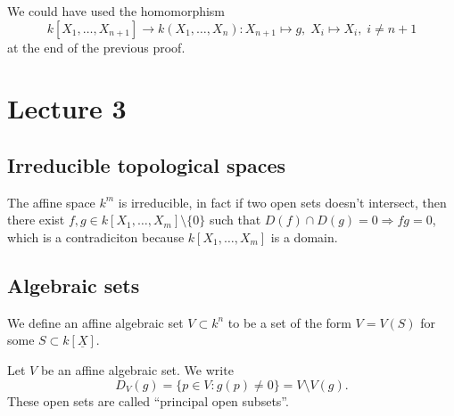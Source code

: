 \begin{remark}
    We could have used the homomorphism 
    \begin{equation}
        k[X_1,\dots,X_{n+1}]\rightarrow k(X_1,\dots,X_n):X_{n+1}\mapsto g,\;X_i\mapsto X_i,\;i\neq n+1
    \end{equation}
    at the end of the previous proof.
\end{remark}

\section{Lecture 3}
\subsection{Irreducible topological spaces}
\begin{example}
    The affine space $k^m$ is irreducible, in fact if two open sets doesn't intersect, then there exist
    $f,g\in k[X_1,\dots,X_m]\setminus\{0\}$ such that $D(f)\cap D(g)=0\Rightarrow fg = 0$, which is a contradiciton 
    because $k[X_1,\dots,X_m]$ is a domain.
\end{example}

\subsection{Algebraic sets}
\begin{dang}
    \begin{definition}
        We define an affine algebraic set $V\subset k^n$ to be a set of the form $V=V(S)$ for 
        some $S\subset k[\underline{X}]$.
    \end{definition}
\end{dang}


\begin{notation}
    Let $V$ be an affine algebraic set. We write 
    \begin{equation}
        D_V(g) = \{p\in V: g(p)\neq0\} = V\setminus V(g).
    \end{equation}
    These open sets are called ``principal open subsets''.
\end{notation}

